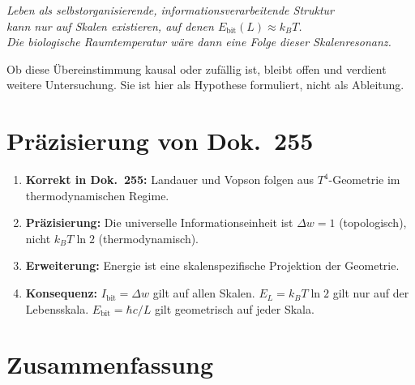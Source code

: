 \begin{center}
\textit{Leben als selbstorganisierende, informationsverarbeitende Struktur\\
kann nur auf Skalen existieren, auf denen \(E_\text{bit}(L) \approx k_BT\).\\
Die biologische Raumtemperatur wäre dann eine Folge dieser Skalenresonanz.}
\end{center}

Ob diese Übereinstimmung kausal oder zufällig ist, bleibt offen
und verdient weitere Untersuchung.
Sie ist hier als Hypothese formuliert, nicht als Ableitung.

\section{Präzisierung von Dok.~255}

\begin{enumerate}
  \item \textbf{Korrekt in Dok.~255:}
        Landauer und Vopson folgen aus \(T^4\)-Geometrie
        im thermodynamischen Regime.
  \item \textbf{Präzisierung:}
        Die universelle Informationseinheit ist \(\Delta w = 1\)
        (topologisch), nicht \(k_BT\ln2\) (thermodynamisch).
  \item \textbf{Erweiterung:}
        Energie ist eine skalenspezifische Projektion der Geometrie.
  \item \textbf{Konsequenz:}
        \(I_\text{bit} = \Delta w\) gilt auf allen Skalen.
        \(E_L = k_BT\ln2\) gilt nur auf der Lebensskala.
        \(E_\text{bit} = \hbar c/L\) gilt geometrisch auf jeder Skala.
\end{enumerate}

\section{Zusammenfassung}

